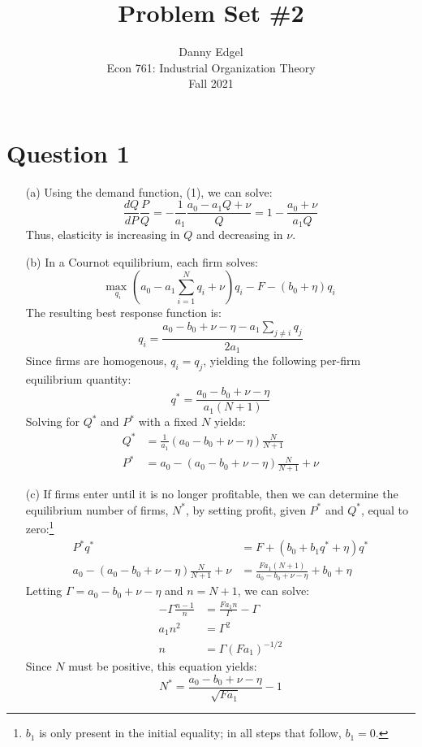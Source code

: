 \documentclass{article}
\newcommand{\usmax}[1]{\underset{#1}{\text{max }}}
\begin{document}
\title{	Problem Set \#2 }
\author{ 	Danny Edgel 					        	      \\ 
			Econ 761: Industrial Organization Theory	\\
			Fall 2021						                      \\
		}
\maketitle\thispagestyle{empty}



\section*{Question 1}
\begin{itemize}
    \item[(a)] Using the demand function, (1), we can solve: \[
    \frac{dQ}{dP}\frac{P}{Q} = -\frac{1}{a_1}\frac{a_0 - a_1Q + \nu}{Q} = 1 - \frac{a_0 + \nu}{a_1Q}
    \] 
    Thus, elasticity is increasing in $Q$ and decreasing in $\nu$.

    \item[(b)] In a Cournot equilibrium, each firm solves:\[
      \usmax{q_i}\left(a_0 - a_1\sum_{i=1}^Nq_i + \nu\right)q_i - F - (b_0+\eta)q_i
    \]
    The resulting best response function is:\[
      q_i = \frac{a_0-b_0+\nu-\eta-a_1\sum_{j\neq i}q_j}{2a_1}
    \]
    Since firms are homogenous, $q_i=q_j$, yielding the following per-firm equilibrium quantity:\[
      q^* = \frac{a_0-b_0+\nu-\eta}{a_1(N+1)}
    \]
    Solving for $Q^*$ and $P^*$ with a fixed $N$ yields:\begin{align*}
      Q^* &= \frac{1}{a_1}\left(a_0-b_0+\nu-\eta\right)\frac{N}{N+1} \\ 
      P^* &= a_0 - \left(a_0-b_0+\nu-\eta\right)\frac{N}{N+1} + \nu
    \end{align*}
    \item[(c)] If firms enter until it is no longer profitable, then we can determine the equilibrium number of firms, $N^*$, by setting profit, given $P^*$ and $Q^*$, equal to zero:\footnote{$b_1$ is only present in the initial equality; in all steps that follow, ${b_1=0}$.} \begin{align*} 
      P^*q^*&= F  + (b_0 + b_1q^* + \eta)q^* \\
      a_0-(a_0-b_0+\nu-\eta)\frac{N}{N+1} + \nu &= \frac{Fa_1(N+1)}{a_0-b_0 + \nu - \eta}+b_0+\eta
    \end{align*}
    Letting ${\Gamma=a_0-b_0 + \nu - \eta}$ and ${n=N+1}$, we can solve:\begin{align*}
      -\Gamma\frac{n-1}{n} &= \frac{Fa_1n}{\Gamma} - \Gamma   \\
      a_1n^2 &= \Gamma^2                                      \\
      n &= \Gamma (Fa_1)^{-1/2}
    \end{align*}
    Since $N$ must be positive, this equation yields: \[
      N^* = \frac{a_0 - b_0 + \nu - \eta}{\sqrt{Fa_1}} - 1
    \]


\end{itemize}
\end{document}
